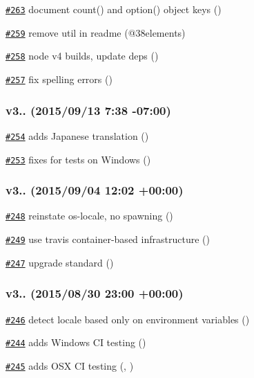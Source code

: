 \begin{DoxyItemize}
\item \href{https://github.com/bcoe/yargs/pull/263}{\tt \#263} document count() and option() object keys ()
\item \href{https://github.com/bcoe/yargs/pull/259}{\tt \#259} remove util in readme (@38elements)
\item \href{https://github.com/bcoe/yargs/pull/258}{\tt \#258} node v4 builds, update deps ()
\item \href{https://github.com/bcoe/yargs/pull/257}{\tt \#257} fix spelling errors ()
\end{DoxyItemize}

\subsubsection*{v3.. (2015/09/13 7\+:38 -\/07\+:00)}


\begin{DoxyItemize}
\item \href{https://github.com/bcoe/yargs/pull/254}{\tt \#254} adds Japanese translation ()
\item \href{https://github.com/bcoe/yargs/pull/253}{\tt \#253} fixes for tests on Windows ()
\end{DoxyItemize}

\subsubsection*{v3.. (2015/09/04 12\+:02 +00\+:00)}


\begin{DoxyItemize}
\item \href{https://github.com/bcoe/yargs/pull/248}{\tt \#248} reinstate os-\/locale, no spawning ()
\item \href{https://github.com/bcoe/yargs/pull/249}{\tt \#249} use travis container-\/based infrastructure ()
\item \href{https://github.com/bcoe/yargs/pull/247}{\tt \#247} upgrade standard ()
\end{DoxyItemize}

\subsubsection*{v3.. (2015/08/30 23\+:00 +00\+:00)}


\begin{DoxyItemize}
\item \href{https://github.com/bcoe/yargs/pull/246}{\tt \#246} detect locale based only on environment variables ()
\item \href{https://github.com/bcoe/yargs/pull/244}{\tt \#244} adds Windows CI testing ()
\item \href{https://github.com/bcoe/yargs/pull/245}{\tt \#245} adds O\+SX CI testing (, )
\end{DoxyItemize}

